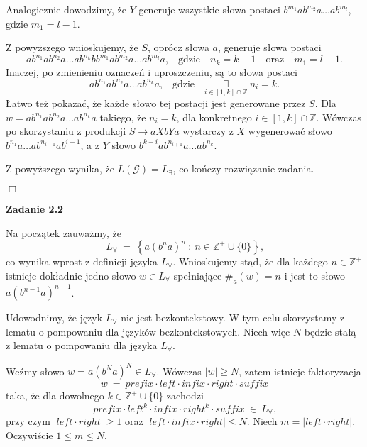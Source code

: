 \documentclass[12pt]{article}
\begin{document}
	\medskip
	
	Analogicznie dowodzimy, że \(Y\) generuje wszystkie słowa postaci
	\(b^{m_{1}} a b^{m_{2}} a \ldots a b^{m_{l}}\), gdzie \(m_{1} = l - 1\).
	
	\medskip
	
	Z powyższego wnioskujemy, że \(S\), oprócz słowa \(a\), generuje słowa
	postaci
	\[ a b^{n_{1}} a b^{n_{2}} a \ldots a b^{n_{k}} b b^{m_{1}} a b^{m_{2}} a
	\ldots a b^{m_{l}} a \text{,} \quad \text{gdzie} \quad n_{k} = k - 1 \quad
	\text{oraz} \quad m_{1} = l - 1 \text{.} \]
	Inaczej, po zmienieniu oznaczeń i uproszczeniu, są to słowa postaci
	\[ a b^{n_{1}} a b^{n_{2}}a \ldots a b^{n_{k}} a \text{,} \quad \text{gdzie}
	\quad \underset{i \in \left[ 1, k \right] \cap \mathbb{Z}}{\exists} \ n_{i}
	= k \text{.} \]
	Łatwo też pokazać, że każde słowo tej postacji jest generowane przez \(S\).
	Dla \(w = a b^{n_{1}} a b^{n_{2}} a \ldots a b^{n_{k}} a\) takiego, że
	\(n_{i} = k\), dla konkretnego \(i \in \left[ 1, k \right] \cap
	\mathbb{Z}\). Wówczas po skorzystaniu z produkcji \(S \longrightarrow
	aXbYa\) wystarczy z \(X\) wygenerować słowo \(b^{n_{1}} a \ldots a
	b^{n_{i - 1}} a b^{i - 1}\), a z \(Y\) słowo \(b^{k - i} a b^{n_{i + 1}} a
	\ldots a b^{n_{k}}\).
	
	\medskip
	
	Z powyższego wynika, że \(L \left( \mathcal{G} \right) = L_{\exists}\), co
	kończy rozwiązanie zadania.
	\begin{flushright}
		\(\Box\)
	\end{flushright}
	
	\textbf{Zadanie 2.2}
	
	\medskip
	
	Na początek zauważmy, że
	\[ L_{\forall} \ = \ \left\{ a \left( b^{n} a \right) ^ {n} \ : \ n \in
	\mathbb{Z}^{+} \cup \{0\} \right\} \text{,} \]
	co wynika wprost z definicji języka \(L_{\forall}\). Wnioskujemy stąd, że
	dla każdego \(n \in \mathbb{Z}^{+}\) istnieje dokładnie jedno słowo \(w \in
	L_{\forall}\) spełniające \(\#_{a} \left( w \right) = n\) i jest to słowo
	\(a \left( b^{n - 1} a \right) ^ {n - 1}\).
	
	\medskip
	
	Udowodnimy, że język \(L_{\forall}\) nie jest bezkontekstowy. W tym celu
	skorzystamy z lematu o pompowaniu dla języków bezkontekstowych. Niech
	więc \(N\) będzie stałą z lematu o pompowaniu dla języka \(L_{\forall}\).
	
	\medskip
	
	Weźmy słowo \(w = a \left( b^{N} a \right) ^ {N} \in L_{\forall}\). Wówczas
	\(|w| \geqslant N\), zatem istnieje faktoryzacja
	\[ w \ = \ prefix \cdot left \cdot infix \cdot right \cdot suffix \]
	taka, że dla dowolnego \(k \in \mathbb{Z}^{+} \cup \{0\}\) zachodzi
	\[ prefix \cdot left^{k} \cdot infix \cdot right^{k} \cdot suffix \ \in \
	L_{\forall} \text{,} \]
	przy czym \(\left| left \cdot right \right| \geqslant 1\) oraz \(\left| left
	\cdot infix \cdot right \right| \leqslant N\). Niech \(m = \left| left \cdot
	right \right|\). Oczywiście \(1 \leqslant m \leqslant N\).
	
\end{document}
